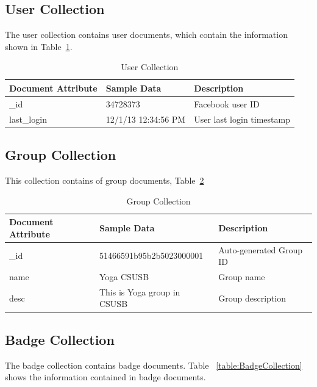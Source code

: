 \subsection{User Collection}
The user collection contains user documents, which contain the information shown in Table~\ref{table:UserCollection}.

\begin{table}[H]
\caption{User Collection}
\label{table:UserCollection}
\textbf{ }
\begin{center}
\begin{tabular}{ | l | l |  l | }
\hline
Document Attribute & Sample Data & Description \\ \hline
{\_}id & 34728373 & Facebook user ID \\ \hline
last{\_}login & 12/1/13 12:34:56 PM & User last login timestamp   \\ \hline
\end{tabular}
\end{center}
\end{table}

\subsection{Group Collection}
This collection contains of group documents,  Table~\ref{table:GroupCollection}

\begin{table}[H]
\caption{Group Collection}\label{table:GroupCollection}
\textbf{ }
\begin{center}
\begin{tabular}{ | l | l |  l | }
\hline
Document Attribute & Sample Data & Description \\ \hline
{\_}id &  51466591b95b2b5023000001 & Auto-generated Group ID \\ \hline
name & Yoga CSUSB & Group name   \\ \hline
desc & This is Yoga group in CSUSB & Group description   \\ \hline
\end{tabular}
\end{center}
\end{table}


\subsection{Badge Collection}
The badge collection contains badge documents. Table ~\ref{table:BadgeCollection} shows the information contained in badge documents.

